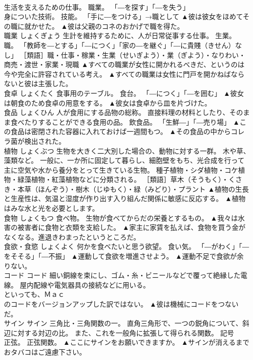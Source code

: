 \documentclass[8pt]{extreport}
\begin{document}
\begin{CJK}{UTF8}{min}
\\	生活を支えるための仕事。 職業。 「―を探す」「―を失う」 
\\	身についた技術。 技能。 「手に―をつける」→職として	▲彼は彼女をほめてその職に就かせた。 ▲彼は父親のコネのおかげで職を得た。
\\	職業	しょくぎょう	生計を維持するために、人が日常従事する仕事。 生業。 職。 「教師を―とする」「―につく」「家の―を継ぐ」「―に貴賤（きせん）なし」 ［類語］職・仕事・稼業・生業（せいぎよう）・業（ぎよう）・なりわい・商売・渡世・家業・現職	▲すべての職業が女性に開かれるべきだ、というのは今や完全に許容されている考え。 ▲すべての職業は女性に門戸を開かねばならないと彼は主張した。
\\	食卓	しょくたく	食事用のテーブル。 食台。 「―につく」「―を囲む」	▲彼女は朝食のため食卓の用意をする。 ▲彼女は食卓から皿を片づけた。
\\	食品	しょくひん	人が食用にする品物の総称。 直接料理の材料としたり、そのまま食べたりすることができる食用の品。 飲食品。 「生鮮―」「―売り場」	▲この食品は密閉された容器に入れておけば一週間もつ。 ▲その食品の中からコレラ菌が検出された。
\\	植物	しょくぶつ	生物を大きく二大別した場合の、動物に対する一群。 木や草、藻類など。 一般に、一か所に固定して暮らし、細胞壁をもち、光合成を行って主に空気や水から養分をとって生きている生物。 種子植物・シダ植物・コケ植物・緑藻植物・紅藻植物などに分類される。 ［類語］草木（そうもく）・くさき・本草（ほんぞう）・樹木（じゆもく）・緑（みどり）・プラント	▲植物の生長と生産性は、気温と湿度が作り出す入り組んだ関係に敏感に反応する。 ▲植物はみな水と光を必要とします。
\\	食物	しょくもつ	食べ物。 生物が食べてからだの栄養とするもの。	▲我々は水害の被害者に食物と衣類を支給した。 ▲家主に家賃を払えば、食物を買う金がなくなる。進退きわまったというところだ。
\\	食欲・食慾	しょくよく	何かを食べたいと思う欲望。 食い気。 「―がわく」「―をそそる」「―不振」	▲運動して食欲を増進させよう。 ▲運動不足で食欲が余りない。
\\	コード	コード	細い銅線を束にし、ゴム・糸・ビニールなどで覆って絶縁した電線。 屋内配線や電気器具の接続などに用いる。	
\\	といっても、Ｍａｃ 
\\	のコードをバージョンアップした訳ではない。 ▲彼は機械にコードをつないだ。
\\	サイン	サイン	三角比・三角関数の一。 直角三角形で、一つの鋭角について、斜辺に対する対辺の比。 また、これを一般角に拡張して得られる関数。 記号
\\	正弦。 正弦関数。	▲ここにサインをお願いできますか。 ▲サインが消えるまでおタバコはご遠慮下さい。

\end{CJK}
\end{document}
